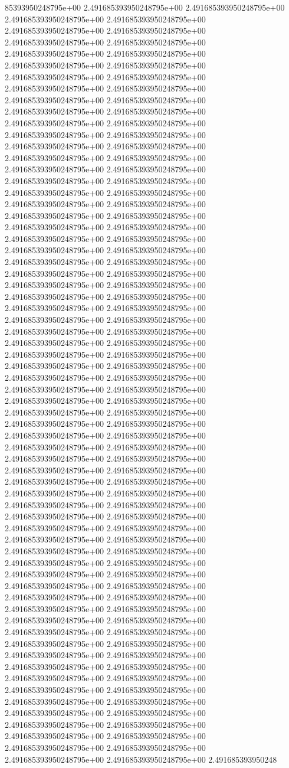 85393950248795e+00	2.491685393950248795e+00	2.491685393950248795e+00	2.491685393950248795e+00	2.491685393950248795e+00	2.491685393950248795e+00	2.491685393950248795e+00	2.491685393950248795e+00	2.491685393950248795e+00	2.491685393950248795e+00	2.491685393950248795e+00	2.491685393950248795e+00	2.491685393950248795e+00	2.491685393950248795e+00	2.491685393950248795e+00	2.491685393950248795e+00	2.491685393950248795e+00	2.491685393950248795e+00	2.491685393950248795e+00	2.491685393950248795e+00	2.491685393950248795e+00	2.491685393950248795e+00	2.491685393950248795e+00	2.491685393950248795e+00	2.491685393950248795e+00	2.491685393950248795e+00	2.491685393950248795e+00	2.491685393950248795e+00	2.491685393950248795e+00	2.491685393950248795e+00	2.491685393950248795e+00	2.491685393950248795e+00	2.491685393950248795e+00	2.491685393950248795e+00	2.491685393950248795e+00	2.491685393950248795e+00	2.491685393950248795e+00	2.491685393950248795e+00	2.491685393950248795e+00	2.491685393950248795e+00	2.491685393950248795e+00	2.491685393950248795e+00	2.491685393950248795e+00	2.491685393950248795e+00	2.491685393950248795e+00	2.491685393950248795e+00	2.491685393950248795e+00	2.491685393950248795e+00	2.491685393950248795e+00	2.491685393950248795e+00	2.491685393950248795e+00	2.491685393950248795e+00	2.491685393950248795e+00	2.491685393950248795e+00	2.491685393950248795e+00	2.491685393950248795e+00	2.491685393950248795e+00	2.491685393950248795e+00	2.491685393950248795e+00	2.491685393950248795e+00	2.491685393950248795e+00	2.491685393950248795e+00	2.491685393950248795e+00	2.491685393950248795e+00	2.491685393950248795e+00	2.491685393950248795e+00	2.491685393950248795e+00	2.491685393950248795e+00	2.491685393950248795e+00	2.491685393950248795e+00	2.491685393950248795e+00	2.491685393950248795e+00	2.491685393950248795e+00	2.491685393950248795e+00	2.491685393950248795e+00	2.491685393950248795e+00	2.491685393950248795e+00	2.491685393950248795e+00	2.491685393950248795e+00	2.491685393950248795e+00	2.491685393950248795e+00	2.491685393950248795e+00	2.491685393950248795e+00	2.491685393950248795e+00	2.491685393950248795e+00	2.491685393950248795e+00	2.491685393950248795e+00	2.491685393950248795e+00	2.491685393950248795e+00	2.491685393950248795e+00	2.491685393950248795e+00	2.491685393950248795e+00	2.491685393950248795e+00	2.491685393950248795e+00	2.491685393950248795e+00	2.491685393950248795e+00	2.491685393950248795e+00	2.491685393950248795e+00	2.491685393950248795e+00	2.491685393950248795e+00	2.491685393950248795e+00	2.491685393950248795e+00	2.491685393950248795e+00	2.491685393950248795e+00	2.491685393950248795e+00	2.491685393950248795e+00	2.491685393950248795e+00	2.491685393950248795e+00	2.491685393950248795e+00	2.491685393950248795e+00	2.491685393950248795e+00	2.491685393950248795e+00	2.491685393950248795e+00	2.491685393950248795e+00	2.491685393950248795e+00	2.491685393950248795e+00	2.491685393950248795e+00	2.491685393950248795e+00	2.491685393950248795e+00	2.491685393950248795e+00	2.491685393950248795e+00	2.491685393950248795e+00	2.491685393950248795e+00	2.491685393950248795e+00	2.491685393950248795e+00	2.491685393950248795e+00	2.491685393950248795e+00	2.491685393950248795e+00	2.491685393950248795e+00	2.491685393950248795e+00	2.491685393950248795e+00	2.491685393950248795e+00	2.491685393950248795e+00	2.491685393950248